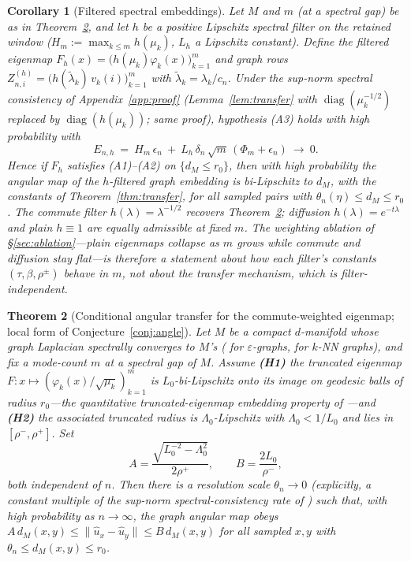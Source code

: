 \documentclass[11pt]{article}
\newtheorem{theorem}{Theorem}
\newtheorem{corollary}[theorem]{Corollary}
\theoremstyle{remark}
\begin{document}
\begin{corollary}[Filtered spectral embeddings]\label{cor:filtered}
Let $M$ and $m$ (at a spectral gap) be as in Theorem~\ref{thm:cond}, and
let $h$ be a positive Lipschitz spectral filter on the retained window
($H_m:=\max_{k\le m}h(\mu_k)$, $L_h$ a Lipschitz constant). Define the filtered
eigenmap $F_h(x)=\big(h(\mu_k)\varphi_k(x)\big)_{k=1}^m$ and graph rows
$Z^{(h)}_{n,i}=\big(h(\tilde\lambda_k)\,v_k(i)\big)_{k=1}^m$ with
$\tilde\lambda_k=\lambda_k/c_n$. Under the sup-norm spectral consistency of
Appendix~\ref{app:proof} (Lemma~\ref{lem:transfer} with
$\operatorname{diag}(\mu_k^{-1/2})$ replaced by
$\operatorname{diag}(h(\mu_k))$; same proof), hypothesis (A3) holds with high
probability with
\[
E_{n,h}\ =\ H_m\,\epsilon_n\ +\ L_h\,\delta_n\,\sqrt m\,(\Phi_m+\epsilon_n)
\ \longrightarrow\ 0 .
\]
Hence if $F_h$ satisfies (A1)--(A2) on $\{d_M\le r_0\}$, then with high
probability the angular map of the $h$-filtered graph embedding is
bi-Lipschitz to $d_M$, with the constants of Theorem~\ref{thm:transfer}, for
all sampled pairs with $\theta_n(\eta)\le d_M\le r_0$. The commute filter
$h(\lambda)=\lambda^{-1/2}$ recovers Theorem~\ref{thm:cond}; diffusion
$h(\lambda)=e^{-t\lambda}$ and plain $h\equiv1$ are equally admissible \emph{at
fixed} $m$. The weighting ablation of \S\ref{sec:ablation}---plain eigenmaps
collapse as $m$ grows while commute and diffusion stay flat---is therefore a
statement about how each filter's constants $(\tau,\beta,\rho^\pm)$ behave
\emph{in} $m$, not about the transfer mechanism, which is filter-independent.
\end{corollary}

\begin{theorem}[Conditional angular transfer for the commute-weighted eigenmap; local form of Conjecture~\ref{conj:angle}]\label{thm:cond}
Let $M$ be a compact $d$-manifold whose graph Laplacian spectrally converges
to $M$'s (\cite{garciatrillos2018} for $\varepsilon$-graphs, \cite{calder2022}
for $k$-NN graphs), and fix a mode-count $m$ \emph{at a spectral gap} of $M$.
Assume \textbf{(H1)} the truncated eigenmap
$F:x\mapsto(\varphi_k(x)/\sqrt{\mu_k})_{k=1}^m$ is $L_0$-bi-Lipschitz onto its image
on geodesic balls of radius $r_0$---the quantitative truncated-eigenmap embedding
property of \cite{berard1994,bates2014,portegies2016}---and \textbf{(H2)} the
associated truncated radius is $\Lambda_0$-Lipschitz with $\Lambda_0<1/L_0$ and
lies in $[\rho^-,\rho^+]$. Set
\[
A=\frac{\sqrt{L_0^{-2}-\Lambda_0^{2}}}{2\rho^{+}},\qquad
B=\frac{2L_0}{\rho^{-}},
\]
both independent of $n$. Then there is a resolution scale $\theta_n\to0$
(explicitly, a constant multiple of the sup-norm spectral-consistency rate of
\cite{calder2022}) such that, with high probability as $n\to\infty$, the graph
angular map obeys
$A\,d_M(x,y)\le\lVert\hat u_x-\hat u_y\rVert\le B\,d_M(x,y)$ for all sampled $x,y$
with $\theta_n\le d_M(x,y)\le r_0$.
\end{theorem}
\end{document}
